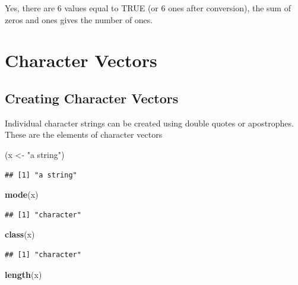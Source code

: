 \documentclass[10pt,b5paper,krantz1]{krantz}
\newenvironment{Shaded}{\begin{snugshade}}{\end{snugshade}}
\newcommand{\KeywordTok}[1]{\textcolor[rgb]{0.27,0.27,0.27}{\textbf{#1}}}
\newcommand{\NormalTok}[1]{#1}
\newcommand{\StringTok}[1]{\textcolor[rgb]{0.5,0.5,0.5}{#1}}
\begin{document}
Yes, there are 6 values equal to TRUE (or 6 ones after conversion), the sum
of zeros and ones gives the number of ones.

\hypertarget{character-vectors}{%
\section{Character Vectors}\label{character-vectors}}

\hypertarget{creating-character-vectors}{%
\subsection{Creating Character Vectors}\label{creating-character-vectors}}

Individual character strings can be created using double quotes or apostrophes.
These are the elements of character vectors

\begin{Shaded}
\begin{Highlighting}[]
\NormalTok{(x <-}\StringTok{ "a string"}\NormalTok{)}
\end{Highlighting}
\end{Shaded}

\begin{verbatim}
## [1] "a string"
\end{verbatim}

\begin{Shaded}
\begin{Highlighting}[]
\KeywordTok{mode}\NormalTok{(x)}
\end{Highlighting}
\end{Shaded}

\begin{verbatim}
## [1] "character"
\end{verbatim}

\begin{Shaded}
\begin{Highlighting}[]
\KeywordTok{class}\NormalTok{(x)}
\end{Highlighting}
\end{Shaded}

\begin{verbatim}
## [1] "character"
\end{verbatim}

\begin{Shaded}
\begin{Highlighting}[]
\KeywordTok{length}\NormalTok{(x)}
\end{Highlighting}
\end{Shaded}
\end{document}
